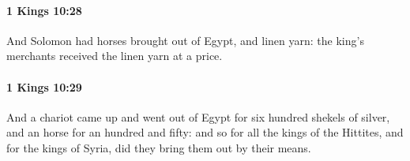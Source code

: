 		\paragraph{1 Kings 10:28} %
			\label{1KINGS-10-28}

			And Solomon had horses brought out of Egypt, and linen yarn: the king’s merchants received the linen yarn at a price.


		\paragraph{1 Kings 10:29} %
			\label{1KINGS-10-29}

			And a chariot came up and went out of Egypt for six hundred shekels of silver, and an horse for an hundred and fifty: and so for all the kings of the Hittites, and for the kings of Syria, did they bring them out by their means.

